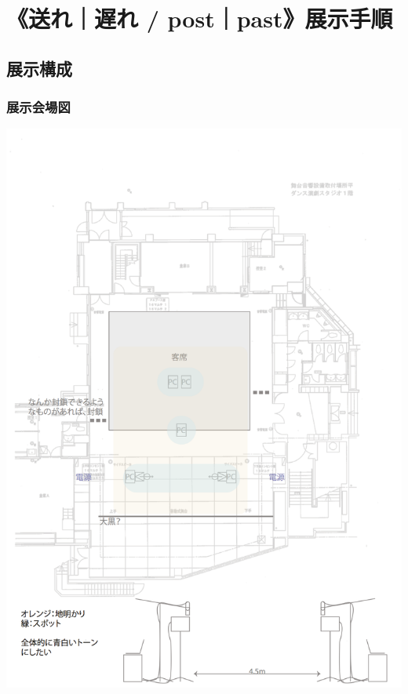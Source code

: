 \documentclass[a4paper]{jsarticle}
\begin{document}
\section{《送れ｜遅れ /
post｜past》展示手順}\label{ux9001ux308cux9045ux308c-postpastux5c55ux793aux624bux9806}

\subsection{展示構成}\label{ux5c55ux793aux69cbux6210}

\subsubsection{展示会場図}\label{ux5c55ux793aux4f1aux5834ux56f3}

\includegraphics[width=1.00000\textwidth]{../archive_data/exhibition_plan/161030exhibition_plan_light.png}~
\end{document}
